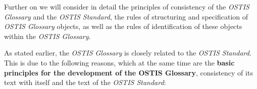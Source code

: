 \documentclass[10 pt]{extarticle}
\begin{document}
\begin{multicols}{2}
\setlength{\parskip}{3 pt}

Further on we will consider in detail the principles of
consistency of the \textit{OSTIS Glossary} and the \textit{OSTIS Standard}, the rules of structuring and specification of \textit{OSTIS Glossary} objects, as well as the rules of identification of these objects within the \textit{OSTIS Glossary}.  \break

\setlength{\parskip}{0 pt}

 \break

As stated earlier, the \textit{OSTIS Glossary} is closely related
to the \textit{OSTIS Standard}. This is due to the following
reasons, which at the same time are the \textbf{basic principles
for the development of the OSTIS Glossary}, consistency
of its text with itself and the text of the \textit{OSTIS Standard}:

\setlength{\parskip}{3 pt}


\end{multicols}
\end{document}
